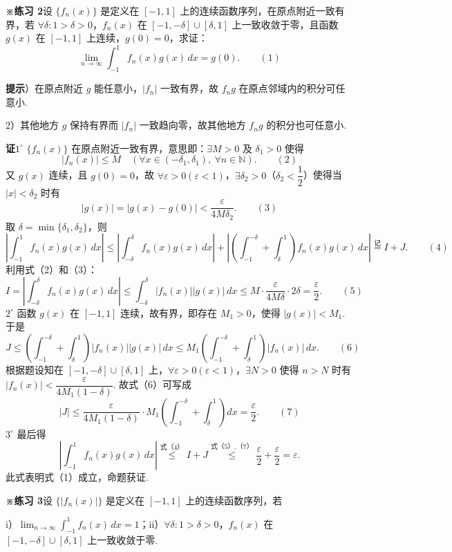 \documentclass[UTF8,12pt,a4paper,fontset=fandol]{ctexart}
\begin{document}
\noindent\textbf{※练习 2}\quad 设 $\{f_n(x)\}$ 是定义在 $[-1,1]$ 上的连续函数序列，在原点附近一致有界，若
$\forall\delta:1>\delta>0$，$f_n(x)$ 在 $[-1,-\delta]\cup[\delta,1]$ 上一致收敛于零，且函数
$g(x)$ 在 $[-1,1]$ 上连续，$g(0)=0$，求证：
\[
  \lim_{n\to\infty}\int_{-1}^1 f_n(x)g(x)\,dx=g(0).
\qquad(1)
\]

\noindent\textbf{提示}）在原点附近 $g$ 能任意小，$|f_n|$ 一致有界，故 $f_ng$ 在原点邻域内的积分可任意小.

2）其他地方 $g$ 保持有界而 $|f_n|$ 一致趋向零，故其他地方 $f_ng$ 的积分也可任意小.

\noindent\textbf{证}\quad $1^\circ$ $\{f_n(x)\}$ 在原点附近一致有界，意思即：$\exists M>0$ 及 $\delta_1>0$ 使得
\[
  |f_n(x)|\le M\quad(\forall x\in(-\delta_1,\delta_1),\ \forall n\in\mathbb N).
\qquad(2)
\]
又 $g(x)$ 连续，且 $g(0)=0$，故 $\forall\varepsilon>0(\varepsilon<1)$，$\exists\delta_2>0$（$\delta_2<\dfrac12$）使得当
$|x|<\delta_2$ 时有
\[
  |g(x)|=|g(x)-g(0)|<\frac{\varepsilon}{4M\delta_2}.
\qquad(3)
\]
取 $\delta=\min\{\delta_1,\delta_2\}$，则
\[
\left|\int_{-1}^1 f_n(x)g(x)\,dx\right|
\le\left|\int_{-\delta}^{\delta}f_n(x)g(x)\,dx\right|
+\left|\left(\int_{-1}^{-\delta}+\int_{\delta}^1\right)f_n(x)g(x)\,dx\right|
\overset{\text{记}}=I+J.
\qquad(4)
\]
利用式（2）和（3）：
\[
  I=\left|\int_{-\delta}^{\delta}f_n(x)g(x)\,dx\right|
  \le\int_{-\delta}^{\delta}|f_n(x)||g(x)|\,dx
  \le M\cdot\frac{\varepsilon}{4M\delta}\cdot2\delta
  =\frac\varepsilon2.
\qquad(5)
\]
$2^\circ$ 函数 $g(x)$ 在 $[-1,1]$ 连续，故有界，即存在 $M_1>0$，使得 $|g(x)|<M_1$. 于是
\[
  J\le\left(\int_{-1}^{-\delta}+\int_{\delta}^1\right)|f_n(x)||g(x)|\,dx
  \le M_1\left(\int_{-1}^{-\delta}+\int_{\delta}^1\right)|f_n(x)|\,dx.
\qquad(6)
\]
根据题设知在 $[-1,-\delta]\cup[\delta,1]$ 上，$\forall\varepsilon>0(\varepsilon<1)$，$\exists N>0$ 使得
$n>N$ 时有 $|f_n(x)|<\dfrac{\varepsilon}{4M_1(1-\delta)}$. 故式（6）可写成
\[
  |J|\le\frac{\varepsilon}{4M_1(1-\delta)}\cdot M_1\left(\int_{-1}^{-\delta}+\int_{\delta}^1\right)dx
  =\frac\varepsilon2.
\qquad(7)
\]
$3^\circ$ 最后得
\[
  \left|\int_{-1}^1 f_n(x)g(x)\,dx\right|
  \overset{\text{式（4）}}{\le} I+J
  \overset{\text{式（5）,（7）}}{\le}\frac\varepsilon2+\frac\varepsilon2=\varepsilon.
\]
此式表明式（1）成立，命题获证.

\noindent\textbf{※练习 3}\quad 设 $\{|f_n(x)|\}$ 是定义在 $[-1,1]$ 上的连续函数序列，若

i）$\displaystyle\lim_{n\to\infty}\int_{-1}^1 f_n(x)\,dx=1$；ii）$\forall\delta:1>\delta>0$，$f_n(x)$ 在
$[-1,-\delta]\cup[\delta,1]$ 上一致收敛于零.
\end{document}
